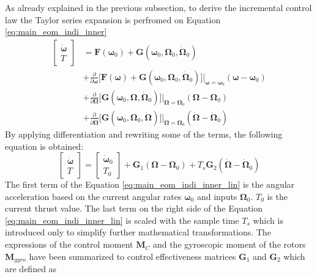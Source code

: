 \documentclass[11pt, a4paper, twoside]{report}
\begin{document}
As already explained in the previous subsection, to derive the incremental control law the Taylor series expansion is perfromed on Equation \ref{eq:main_eom_indi_inner}
\begin{equation}
	\begin{split}
		\begin{bmatrix}
			\bm{\dot{\omega}}\\
			T
		\end{bmatrix} &= \bm{F}(\bm{\omega}_0) + \bm{G}(\bm{\omega}_0, \bm{\Omega}_0, \bm{\dot{\Omega}}_0) \\
		&+ \frac{\partial}{\partial \bm{\omega}} \big[\bm{F}(\bm{\omega}) + \bm{G}(\bm{\omega}_0, \bm{\Omega}_0, \bm{\dot{\Omega}}_0) \big] \bigg| _{\bm{\omega}=\bm{\omega}_0} (\bm{\omega}-\bm{\omega}_0) \\
		&+ \frac{\partial}{\partial \bm{\Omega}} \big[\bm{G}(\bm{\omega}_0, \bm{\Omega}, \bm{\dot{\Omega}}_0) \big] \bigg| _{\bm{\Omega}=\bm{\Omega}_0} (\bm{\Omega}-\bm{\Omega}_0) \\
		&+ \frac{\partial}{\partial \bm{\dot{\Omega}}} \big[\bm{G}(\bm{\omega}_0, \bm{\Omega}_0, \bm{\dot{\Omega}}) \big] \bigg| _{\bm{\dot{\Omega}}=\bm{\dot{\Omega}}_0} (\bm{\dot{\Omega}}-\bm{\dot{\Omega}}_0)
		\label{eq:main_eom_indi_inner_taylor}
	\end{split}
\end{equation}
By applying differentiation and rewriting some of the terms, the following equation is obtained:
\begin{equation}
	\begin{bmatrix}
		\bm{\dot{\omega}}\\
		T
	\end{bmatrix} = 
	\begin{bmatrix}
		\bm{\dot{\omega}}_0\\
		T_0
	\end{bmatrix} + \bm{G}_1(\bm{\Omega} - \bm{\Omega}_0) + T_s \bm{G}_2(\bm{\dot{\Omega}} - \bm{\dot{\Omega}}_0)
	\label{eq:main_eom_indi_inner_lin}
\end{equation}
The first term of the Equation \ref{eq:main_eom_indi_inner_lin} is the angular acceleration based on the current angular rates $\bm{\omega}_0$ and inputs $\bm{\Omega}_0$. $T_0$ is the current thrust value. The last term on the right side of the Equation \ref{eq:main_eom_indi_inner_lin} is scaled with the sample time $T_s$ which is introduced only to simplify further mathematical transformations. The expressions of the control moment $\bm{M}_C$ and the gyroscopic moment of the rotors $\bm{M}_{gyro}$ have been summarized to control effectiveness matrices $\bm{G}_1$ and $\bm{G}_2$ which are defined as
\end{document}
